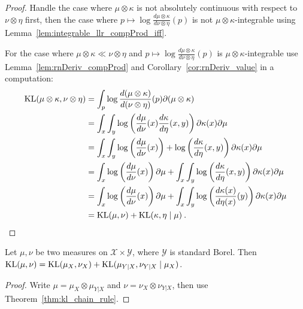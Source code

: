 \begin{proof}
Handle the case where $\mu \otimes \kappa$ is not absolutely continuous with respect to  $\nu \otimes \eta$ first, then the case where $p \mapsto \log \frac{d \mu \otimes \kappa}{d \nu \otimes \eta}(p)$ is not $\mu \otimes \kappa$-integrable using Lemma~\ref{lem:integrable_llr_compProd_iff}.

For the case where $\mu \otimes \kappa \ll \nu \otimes \eta$ and $p \mapsto \log \frac{d \mu \otimes \kappa}{d \nu \otimes \eta}(p)$ is $\mu \otimes \kappa$-integrable use Lemma~\ref{lem:rnDeriv_compProd} and Corollary~\ref{cor:rnDeriv_value} in a computation:
\begin{align*}
\operatorname{KL}(\mu \otimes \kappa, \nu \otimes \eta)
&= \int_p \log \frac{d(\mu \otimes \kappa)}{d(\nu \otimes \eta)}(p) \partial (\mu \otimes \kappa)
\\
&= \int_x \int_y\log \left(\frac{d\mu}{d \nu}(x)\frac{d\kappa}{d \eta}(x,y)\right) \partial \kappa(x) \partial\mu
\\
&= \int_x \int_y\log \left(\frac{d\mu}{d \nu}(x)\right) + \log \left(\frac{d\kappa}{d \eta}(x,y)\right) \partial \kappa(x) \partial\mu
\\
&= \int_x \log \left(\frac{d\mu}{d \nu}(x)\right)\partial\mu + \int_x \int_y\log \left(\frac{d\kappa}{d \eta}(x,y)\right) \partial \kappa(x) \partial\mu
\\
&= \int_x \log \left(\frac{d\mu}{d \nu}(x)\right)\partial\mu + \int_x \int_y\log \left(\frac{d\kappa(x)}{d \eta(x)}(y)\right) \partial \kappa(x) \partial\mu
\\
&= \operatorname{KL}(\mu, \nu) + \operatorname{KL}(\kappa, \eta \mid \mu)
\: .
\end{align*}

\end{proof}

\begin{theorem}
  \label{thm:kl_chain_rule_prod}
  Let $\mu, \nu$ be two measures on $\mathcal X \times \mathcal Y$, where $\mathcal Y$ is standard Borel.
  Then $\operatorname{KL}(\mu, \nu) = \operatorname{KL}(\mu_X, \nu_X) + \operatorname{KL}(\mu_{Y|X}, \nu_{Y|X} \mid \mu_X)$.
\end{theorem}

\begin{proof}
Write $\mu = \mu_X \otimes \mu_{Y|X}$ and $\nu = \nu_X \otimes \nu_{Y|X}$, then use Theorem~\ref{thm:kl_chain_rule}.
\end{proof}

